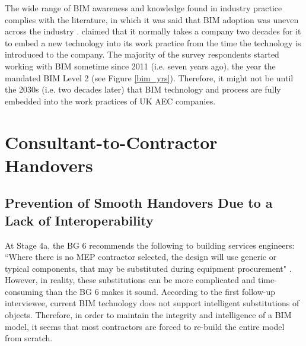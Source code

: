 The wide range of BIM awareness and knowledge found in industry practice complies with the literature, in which it was said that BIM adoption was uneven across the industry \citep{DesigningBuildingsLtd2017}.
\cite{Miettinen2014} claimed that it normally takes a company two decades for it to embed a new technology into its work practice from the time the technology is introduced to the company.
The majority of the survey respondents started working with BIM sometime since 2011 (i.e. seven years ago), the year the \citeauthor{GCS11-15} mandated BIM Level 2 (see Figure \ref{bim_yrs}).
Therefore, it might not be until the 2030s (i.e. two decades later) that BIM technology and process are fully embedded into the work practices of UK AEC companies.



\section{Consultant-to-Contractor Handovers}



\subsection{Prevention of Smooth Handovers Due to a Lack of Interoperability}

At Stage 4a, the BG 6 recommends the following to building services engineers:
``Where there is no MEP contractor selected, the design will use generic or typical components, that may be substituted during equipment procurement" \citep[p.~54]{BG62014}.
However, in reality, these substitutions can be more complicated and time-consuming than the BG 6 makes it sound.
According to the first follow-up interviewee, current BIM technology does not support intelligent substitutions of objects.
Therefore, in order to maintain the integrity and intelligence of a BIM model, it seems that most contractors are forced to re-build the entire model from scratch.

